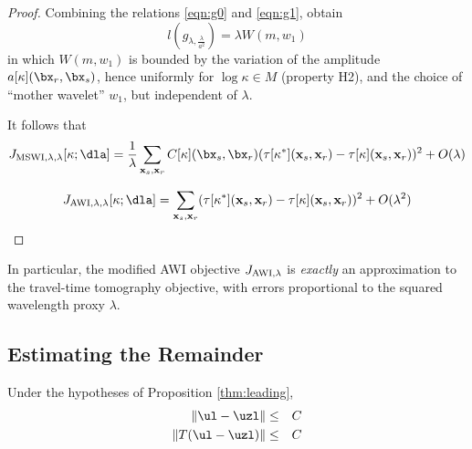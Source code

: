 \begin{proof}
Combining the relations \ref{eqn:g0} and \ref{eqn:g1}, obtain
\begin{equation}
  \label{eqn:pwg}
  l(g_{\lambda,\frac{\lambda}{a^2}}) =\lambda W(m,w_1)
\end{equation}
in which $W(m,w_1)$ is bounded by the variation of the amplitude
$a[\kappa](\bx_r,\bx_s)$, hence uniformly for $\log \kappa \in M$ (property
H2), and the choice of ``mother wavelet'' $w_1$, but
independent of $\lambda$.

It follows that
\begin{equation}
  \label{eqn:mswitt}
  J_{\rm MSWI,\lambda,\lambda}[\kappa;\dla] =
  \frac{1}{\lambda} \sum_{{\bf x}_s,{\bf x}_r} C[\kappa](\bx_s,\bx_r)(\tau[\kappa^*]({\bf
  x}_s,{\bf x}_r)-\tau[\kappa]({\bf x}_s,{\bf x}_r))^2 + O(\lambda)
\end{equation}
  
\begin{equation}
  \label{eqn:awitt}
J_{\rm AWI,\lambda,\lambda}[\kappa;\dla] = \sum_{{\bf x}_s,{\bf x}_r} (\tau[\kappa^*]({\bf
  x}_s,{\bf x}_r)-\tau[\kappa]({\bf x}_s,{\bf x}_r))^2 + O(\lambda^2)
\end{equation}

\end{proof}

In particular, the modified AWI objective $J_{\rm AWI,\lambda}$ is {\em exactly} an approximation to
the travel-time tomography objective, with errors proportional to the squared
wavelength proxy $\lambda$.

\subsection{Estimating the Remainder}

\begin{prop} Under the hypotheses of Proposition \ref{thm:leading},
  \begin{eqnarray}
    \label{eqn:diffests}
    \|\ul-\uzl\| &\le& C \nonumber \\
    \|T(\ul-\uzl)\| &\le& C
  \end{eqnarray}
\end{prop}

